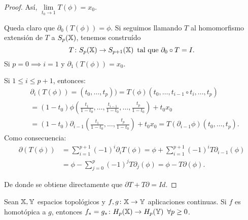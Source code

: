 \begin{proof}
  Así, $\lim\limits_{t_0 \to 1} T(\phi) = x_0$.

  Queda claro que $\partial_0(T(\phi)) = \phi$. Si seguimos llamando $T$ al homomorfismo extensión de $T$ a $S_{p}({\mathbb X})$, tenemos construído
  \[  T \colon S_{p}({\mathbb X}) \to S_{p+1}({\mathbb X}) \hspace{0.5em} \text{tal que } \partial_0 \circ  T = I. \]
  Si $p = 0 \implies i = 1$ y $\partial_1( T(\phi)) = x_0$.

  Si $1 \leq i \leq p+1$, entonces:
  \begin{align*}
    &\partial_i( T(\phi))=(t_0,\dots,t_p)) =  T(\phi)(t_0, \dots, t_{i-1} \circ t_i, \dots, t_p) \\
    &= (1-t_0)\phi(\frac{t_1}{1-t_0}, \dots, \frac{t_{i-1}}{1-t_0}, \dots, \frac{t_p}{1-t_0}) + t_0 x_0 \\
    &= (1-t_0)\partial_{i-1}(\frac{t_1}{1-t_0}, \dots, \frac{t_p}{1-t_0}) + t_0 x_0 = T(\partial_{i-1} \phi)(t_0, \dots, t_p).
  \end{align*}
  Como consecuencia:
  \begin{align*}
    \partial( T(\phi)) &= \sum\limits_{i = 1}^{p+1} (-1)^i \partial_i  T(\phi) = \phi + \sum\limits_{i = 1}^{p+1} (-1)^i  T \partial_{i-1}(\phi) \\
    &= \phi - \sum\limits_{j = 0}^p (-1)^j  T \partial_j(\phi) = \phi -  T \partial(\phi).
  \end{align*}

  De donde se obtiene directamente que $\partial  T +  T \partial = Id$.
\end{proof}

\begin{theorem}
  Sean ${\mathbb X}, {\mathbb Y}$ espacios topológicos y $f, g \colon {\mathbb X} \to {\mathbb Y}$ aplicaciones continuas. Si $f$ es homotópica a $g$,
  entonces $f_* = g_* \colon H_p({\mathbb X}) \to H_p({\mathbb Y}) \hspace{0.5em} \forall p \geq 0$.
\end{theorem}

